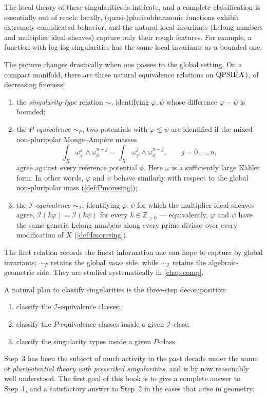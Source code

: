 The local theory of these singularities is intricate, and a complete classification is essentially out of reach: locally, (quasi-)plurisubharmonic functions exhibit extremely complicated behavior, and the natural local invariants (Lelong numbers and multiplier ideal sheaves) capture only their rough features. For example, a function with log-log singularities has the same local invariants as a bounded one.

The picture changes drastically when one passes to the global setting. On a compact manifold, there are three natural equivalence relations on $\mathrm{QPSH}(X)$, of decreasing fineness:
\begin{enumerate}
    \item\label{itm:preface:L22:1} the \emph{singularity-type} relation $\sim$, identifying $\varphi,\psi$ whose difference $\varphi-\psi$ is bounded;
    \item\label{itm:preface:L22:2} the \emph{$P$-equivalence} $\sim_P$, two potentials with $\varphi\leq \psi$ are identified if the mixed non-pluripolar Monge--Amp\`ere masses
    \[
        \int_X \omega_\varphi^j\wedge \omega_\phi^{n-j} = \int_X \omega_\psi^j\wedge \omega_\phi^{n-j},\qquad j=0,\ldots,n,
    \]
    agree against every reference potential $\phi$. Here $\omega$ is a sufficiently large Kähler form. In other words, $\varphi$ and $\psi$ behave similarly with respect to the global non-pluripolar mass (\cref{def:Pmoresing});
    \item\label{itm:preface:L22:3} the \emph{$\mathcal{I}$-equivalence} $\sim_\mathcal{I}$, identifying $\varphi,\psi$ for which the multiplier ideal sheaves agree, $\mathcal{I}(k\varphi)=\mathcal{I}(k\psi)$ for every $k\in\mathbb{Z}_{>0}$ --- equivalently, $\varphi$ and $\psi$ have the same generic Lelong numbers along every prime divisor over every modification of $X$ (\cref{def:Imoresing}).
\end{enumerate}
The first relation records the finest information one can hope to capture by global invariants; $\sim_P$ retains the global \emph{mass} side, while $\sim_\mathcal{I}$ retains the algebraic-geometric side. They are studied systematically in \cref{chap:comp}.

A natural plan to classify singularities is the three-step decomposition:
\begin{enumerate}
    \item\label{itm:preface:L34:1} classify the $\mathcal{I}$-equivalence classes;
    \item\label{itm:preface:L34:2} classify the $P$-equivalence classes inside a given $\mathcal{I}$-class;
    \item\label{itm:preface:L34:3} classify the singularity types inside a given $P$-class.
\end{enumerate}
Step~3 has been the subject of much activity in the past decade under the name of \emph{pluripotential theory with prescribed singularities}, and is by now reasonably well understood. The first goal of this book is to give a complete answer to Step~1, and a satisfactory answer to Step~2 in the cases that arise in geometry.

